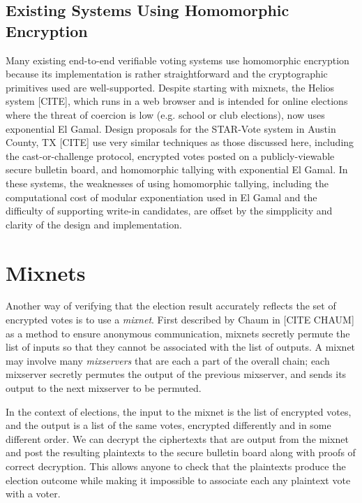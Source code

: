 \subsection{Existing Systems Using Homomorphic Encryption}

Many existing end-to-end verifiable voting systems use homomorphic encryption because its implementation is rather straightforward and the cryptographic primitives used are well-supported. Despite starting with mixnets, the Helios system [CITE], which runs in a web browser and is intended for online elections where the threat of coercion is low (e.g. school or club elections), now uses exponential El Gamal. Design proposals for the STAR-Vote system in Austin County, TX [CITE] use very similar techniques as those discussed here, including the cast-or-challenge protocol, encrypted votes posted on a publicly-viewable secure bulletin board, and homomorphic tallying with exponential El Gamal. In these systems, the weaknesses of using homomorphic tallying, including the computational cost of modular exponentiation used in El Gamal and the difficulty of supporting write-in candidates, are offset by the simpplicity and clarity of the design and implementation.

\section{Mixnets}

Another way of verifying that the election result accurately reflects the set of encrypted votes is to use a \emph{mixnet}. First described by Chaum in [CITE CHAUM] as a method to ensure anonymous communication, mixnets secretly permute the list of inputs so that they cannot be associated with the list of outputs. A mixnet may involve many \emph{mixservers} that are each a part of the overall chain; each mixserver secretly permutes the output of the previous mixserver, and sends its output to the next mixserver to be permuted.

In the context of elections, the input to the mixnet is the list of encrypted votes, and the output is a list of the same votes, encrypted differently and in some different order. We can decrypt the ciphertexts that are output from the mixnet and post the resulting plaintexts to the secure bulletin board along with proofs of correct decryption. This allows anyone to check that the plaintexts produce the election outcome while making it impossible to associate each any plaintext vote with a voter.

